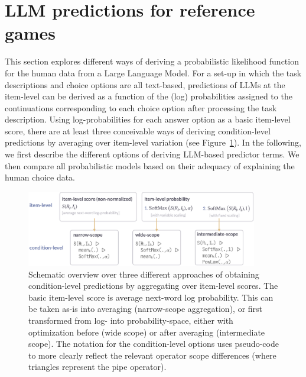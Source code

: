 \documentclass[fleqn]{article}
\begin{document}
\section{LLM predictions for reference games}
\label{llm-predictions-for-reference-games}

This section explores different ways of deriving a probabilistic likelihood function for the human data from a Large Language Model.
For a set-up in which the task descriptions and choice options are all text-based, predictions of LLMs at the item-level can be derived as a function of the (log) probabilities assigned to the continuations corresponding to each choice option after processing the task description.
Using log-probabilities for each answer option as a basic item-level score, there are at least three conceivable ways of deriving condition-level predictions by averaging over item-level variation (see Figure~\ref{fig:measures-overview}).
In the following, we first describe the different options of deriving LLM-based predictor terms.
We then compare all probabilistic models based on their adequacy of explaining the human choice data.

\begin{figure}
  \centering
  \includegraphics[width=0.9\textwidth]{00-pics/measures-overview.png}
  \caption{
    Schematic overview over three different approaches of obtaining condition-level predictions by aggregating over item-level scores.
    The basic item-level score is average next-word log probability.
    This can be taken as-is into averaging (narrow-scope aggregation), or first transformed from log- into probability-space, either with optimization before (wide scope) or after averaging (intermediate scope).
    The notation for the condition-level options uses pseudo-code to more clearly reflect the relevant operator scope differences (where triangles represent the pipe operator).
  }
  \label{fig:measures-overview}
\end{figure}
\end{document}
